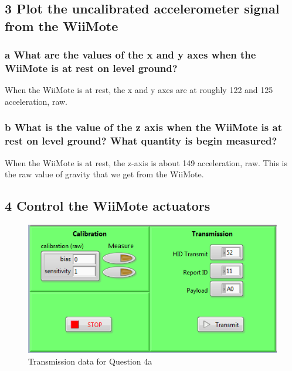\documentclass[10pt,a4paper]{article}
\begin{document}
  \subsection*{3 Plot the uncalibrated accelerometer signal from the WiiMote} 
    \subsubsection*{a What are the values of the x and y axes when the WiiMote is at rest on level ground?}
    When the WiiMote is at rest, the x and y axes are at roughly 122 and 125 acceleration, raw.
    \subsubsection*{b What is the value of the z axis when the WiiMote is at rest on level ground? What quantity is begin measured?}
    When the WiiMote is at rest, the z-axis is about 149 acceleration, raw. This is the raw value of gravity that we get from the WiiMote.
  \subsection*{4 Control the WiiMote actuators}
    \begin{figure}[H]
        \centering
        \includegraphics{../lab1_data/lab1_4a.PNG}
        \caption{Transmission data for Question 4a}
    \end{figure}
\end{document}
